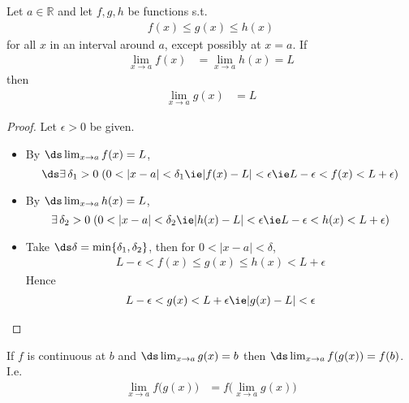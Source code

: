 \begin{theorem} %
  Let $a \in \mathbb{R}$ and let $f, g, h$ be functions s.t.%
  \begin{align*}
    f(x) \leqslant g(x) \leqslant h(x)
  \end{align*}
  for all $x$ in an interval around $a$, except possibly at $x=a$. If
  \begin{align*}
    \lim_{x \to a} f(x) &= \lim_{x \to a} h(x) = L
  \end{align*}
  then %
  \begin{align*}
    \lim_{x \to a} g(x) &= L
  \end{align*}
\end{theorem}
\begin{proof}
  Let $\epsilon > 0$ be given.
  \begin{itemize}
    \item By $\ds\lim_{x\to a}f(x) = L$, $$\ds\exists\,\delta_1 > 0\;(0 < |x - a| < \delta_1 \ie |f(x) - L| < \epsilon \ie L - \epsilon < f(x) < L + \epsilon)$$
    \item By $\ds\lim_{x\to a}h(x) = L$, $$\exists\,\delta_2 > 0\;(0 < |x - a| < \delta_2 \ie |h(x) - L| < \epsilon \ie L - \epsilon < h(x) < L + \epsilon)$$
    \item Take $\ds\delta = \min\{\delta_1, \delta_2\}$, then for $ 0 < |x - a| < \delta$,
      \begin{align*}
        L - \epsilon < f(x)\leqslant g(x)\leqslant h(x) < L + \epsilon
      \end{align*}
      Hence
      \begin{align*}
        L - \epsilon < g(x) < L + \epsilon \ie |g(x) - L| < \epsilon
      \end{align*}
    \end{itemize}
\end{proof}
\begin{theorem}
  If $f$ is continuous at $b$ and $\ds \lim_{x \to a} g(x) = b$ then $\ds \lim_{x\to a} f(g(x)) = f(b)$. I.e.
  \begin{align*}
    \lim_{x \to a} f\big(g(x)\big) &= f\big(\lim_{x \to a} g(x)\big)
  \end{align*}
\end{theorem}
